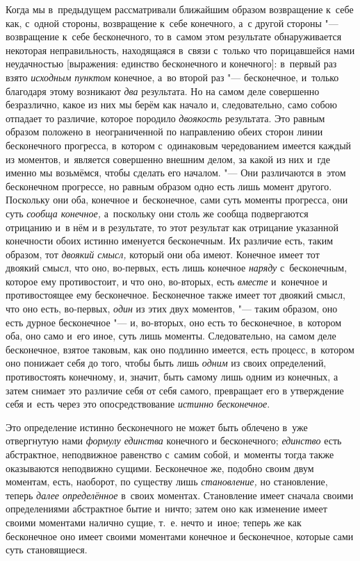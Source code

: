 Когда мы в~предыдущем рассматривали ближайшим образом возвращение к~себе
как, с~одной стороны, возвращение к~себе конечного, а~с другой стороны
"--- возвращение к~себе бесконечного, то в~самом этом результате
обнаруживается некоторая неправильность, находящаяся в~связи с~только что
порицавшейся нами неудачностью [выражения: единство бесконечного и
конечного]: в~первый раз взято {\em исходным пунктом}
конечное, а~во второй раз "--- бесконечное, и~только благодаря этому возникают
{\em два} результата. Но на самом деле совершенно
безразлично, какое из них мы берём как начало и, следовательно, само собою
отпадает то различие, которое породило {\em двоякость}
результата. Это равным образом положено в~неограниченной по направлению
обеих сторон линии бесконечного прогресса, в~котором с~одинаковым
чередованием имеется каждый из моментов, и~является совершенно внешним
делом, за какой из них и~где именно мы возьмёмся, чтобы сделать его
началом. "--- Они различаются в~этом бесконечном прогрессе, но равным образом
одно есть лишь момент другого. Поскольку они оба, конечное и~бесконечное,
сами суть моменты прогресса, они суть {\em сообща
конечное,} а~поскольку они столь же сообща подвергаются отрицанию и~в нём и
в результате, то этот результат как отрицание указанной конечности обоих
истинно именуется бесконечным. Их различие есть, таким образом, тот
{\em двоякий смысл,} который они оба имеют. Конечное
имеет тот двоякий смысл, что оно, во-первых, есть лишь конечное
{\em наряду} с~бесконечным, которое ему противостоит, и
что оно, во-вторых, есть {\em вместе} и~конечное и
противостоящее ему бесконечное. Бесконечное также имеет тот двоякий смысл,
что оно есть, во-первых, {\em один} из этих двух
моментов, "--- таким образом, оно есть дурное бесконечное "--- и, во-вторых, оно
есть то бесконечное, в~котором оба, оно само и~его иное, суть лишь
моменты. Следовательно, на самом деле бесконечное, взятое таковым, как оно
подлинно имеется, есть процесс, в~котором оно понижает себя до того, чтобы
быть лишь {\em одним} из своих определений,
противостоять конечному, и, значит, быть самому лишь одним из конечных, а
затем снимает это различие себя от себя самого, превращает его в
утверждение себя и~есть через это опосредствование
{\em истинно бесконечное}.

Это определение истинно бесконечного не может быть облечено в~уже
отвергнутую нами {\em формулу единства} конечного и
бесконечного; {\em единство} есть абстрактное,
неподвижное равенство с~самим собой, и~моменты тогда также оказываются неподвижно
сущими. Бесконечное же, подобно своим двум моментам, есть, наоборот, по
существу лишь {\em становление,} но становление, теперь
{\em далее определённое} в~своих моментах. Становление
имеет сначала своими определениями абстрактное бытие и~ничто; затем оно как
изменение имеет своими моментами налично сущие, т.~е. нечто и~иное;
теперь же как бесконечное оно имеет своими моментами конечное и
бесконечное, которые сами суть становящиеся.

